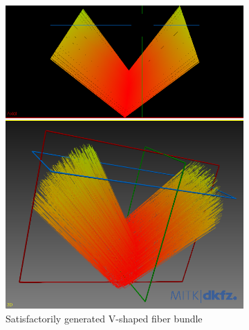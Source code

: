 \documentclass{article}
\begin{document}
  \begin{figure}[!htb]
    \begin{subfigure}[b]{0.4\textwidth}
      \includegraphics[width=\textwidth]{sim_gen__v_shape__good}
      \caption{Satisfactorily generated V-shaped fiber bundle}
      \label{fig:f1-a}
    \end{subfigure}
    \hfill
    \begin{subfigure}[b]{0.4\textwidth}

\end{subfigure}
\end{figure}
\end{document}
